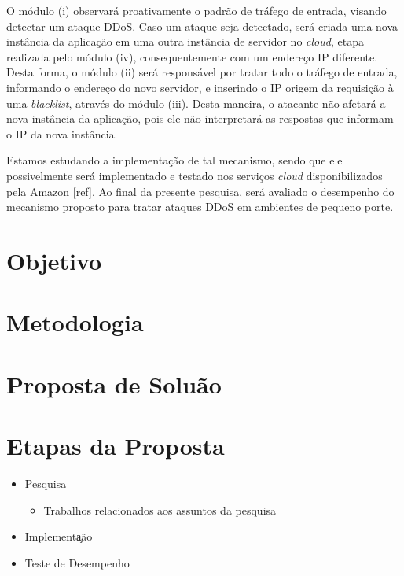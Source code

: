 \documentclass[a4paper, 11pt]{article}
\begin{document}
O módulo (i) observará proativamente o padrão de tráfego de entrada, visando detectar um ataque DDoS. Caso um ataque seja detectado, será criada uma nova instância da aplicação em uma outra instância de servidor no \emph{cloud}, etapa realizada pelo m\'odulo (iv), consequentemente com um endereço IP diferente. Desta forma, o módulo (ii) será responsável por tratar todo o tráfego de entrada, informando o endereço do novo servidor, e inserindo o IP origem da requisição à uma \emph{blacklist}, através do módulo (iii). Desta maneira, o atacante não afetará a nova instância da aplicação, pois ele não interpretará as respostas que informam o IP da nova instância. 

Estamos estudando a implementação de tal mecanismo, sendo que ele possivelmente
será implementado e testado nos serviços \emph{cloud} disponibilizados pela
Amazon [ref]. Ao final da presente pesquisa, ser\'a avaliado o
desempenho do mecanismo proposto para tratar ataques DDoS em ambientes de
pequeno porte.

\section{Objetivo}

\section{Metodologia}

\section{Proposta de Solu\cc\~ao}

\section{Etapas da Proposta}
\begin{itemize}
 \item Pesquisa
  \begin{itemize}
  \item Trabalhos relacionados aos assuntos da pesquisa
  \end{itemize}
 \item Implementa\c\cc\~ao
  \begin{itemize}
  \end{itemize}
 \item Teste de Desempenho 
  \begin{itemize}
  \end{itemize}
\end{itemize}


\newpage


\end{document}
